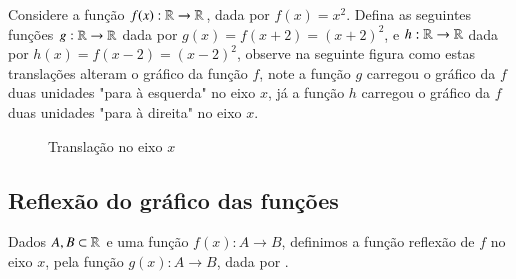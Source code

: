  \begin{exem}
  Considere a função $f(x): \mathbb{R} \to \mathbb{R}$, dada por $f(x)= x^2$. Defina as seguintes funções $g: \mathbb{R} \to \mathbb{R}$ dada por $g(x)= f(x + 2)= (x+2)^2$, e $h: \mathbb{R} \to \mathbb{R}$ dada por $h(x)= f(x-2)= (x-2)^2$, observe na seguinte figura como estas translações alteram o gráfico da função $f$, note a função $g$ carregou o gráfico da $f$ duas unidades "para à esquerda" no eixo $x$, já a função $h$ carregou o gráfico da $f$ duas unidades "para à direita" no eixo $x$.
  
 \begin{figure}[H]
\caption{Translação no eixo $x$}
  \end{figure}
  
 \end{exem}
 
 \subsection{Reflexão do gráfico das funções}
 
 Dados $A, B \subset \mathbb{R}$ e uma função $f(x): A \to B$, definimos a função reflexão de $f$ no eixo $x$, pela função $g(x): A \to B$, dada por .
 
